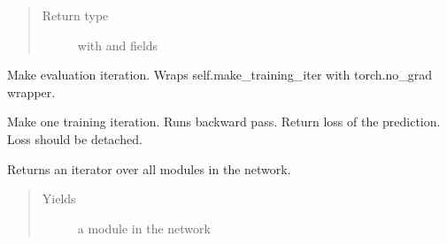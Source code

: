 \documentclass[letterpaper,10pt,english]{sphinxmanual}
\begin{document}
\begin{fulllineitems}
\begin{fulllineitems}
\begin{quote}
\begin{description}
\begin{itemize}
\end{itemize}


\item[{Return type}] \leavevmode
{} with  and  fields

\end{description}\end{quote}

\end{fulllineitems}


\begin{fulllineitems}
\label{\detokenize{api/dynamics:geology.metamodelling.dynamics.NeuralDifferentialEquation.make_evaluation_iter}}
Make evaluation iteration.
Wraps self.make\_training\_iter with torch.no\_grad wrapper.

\end{fulllineitems}


\begin{fulllineitems}
\label{\detokenize{api/dynamics:geology.metamodelling.dynamics.NeuralDifferentialEquation.make_training_iter}}
Make one training iteration. Runs backward pass. Return loss of the prediction.
Loss should be detached.

\end{fulllineitems}


\begin{fulllineitems}
\label{\detokenize{api/dynamics:geology.metamodelling.dynamics.NeuralDifferentialEquation.modules}}
Returns an iterator over all modules in the network.
\begin{quote}\begin{description}
\item[{Yields}] \leavevmode
{} \textendash{} a module in the network


\end{description}
\end{quote}
\end{fulllineitems}
\end{fulllineitems}
\end{document}
